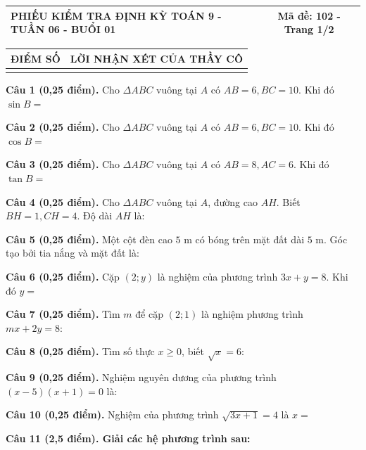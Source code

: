 \documentclass[12pt,a4paper]{article}
\begin{document}
\noindent
\begin{tabularx}{\linewidth}{|X|c|}
\hline
\textbf{PHIẾU KIỂM TRA ĐỊNH KỲ TOÁN 9 - TUẦN 06 - BUỔI 01} & \textbf{Mã đề: 102 - Trang 1/2} \\
\hline
\end{tabularx}

\vspace{1.0mm}

\noindent
\begin{tabularx}{\linewidth}{|p{3.2cm}|X|}
\hline
\centering\textbf{ĐIỂM SỐ} & \centering\textbf{LỜI NHẬN XÉT CỦA THẦY CÔ} \tabularnewline
\hline
\rule{0pt}{1.8cm} & \tabularnewline
\hline
\end{tabularx}

\vspace{1.2mm}
\noindent\textbf{Câu 1 (0,25 điểm).} Cho $\Delta ABC$ vuông tại $A$ có $AB = 6, BC = 10$. Khi đó $\sin B =$ \par\vspace{0.8mm}
\noindent\textbf{Câu 2 (0,25 điểm).} Cho $\Delta ABC$ vuông tại $A$ có $AB = 6, BC = 10$. Khi đó $\cos B =$ \par\vspace{0.8mm}
\noindent\textbf{Câu 3 (0,25 điểm).} Cho $\Delta ABC$ vuông tại $A$ có $AB = 8, AC = 6$. Khi đó $\tan B =$ \par\vspace{0.8mm}
\noindent\textbf{Câu 4 (0,25 điểm).} Cho $\Delta ABC$ vuông tại $A$, đường cao $AH$. Biết $BH=1, CH=4$. Độ dài $AH$ là: \par\vspace{0.8mm}
\noindent\textbf{Câu 5 (0,25 điểm).} Một cột đèn cao $5\text{ m}$ có bóng trên mặt đất dài $5\text{ m}$. Góc tạo bởi tia nắng và mặt đất là: \par\vspace{0.8mm}
\noindent\textbf{Câu 6 (0,25 điểm).} Cặp $(2; y)$ là nghiệm của phương trình $3x + y = 8$. Khi đó $y =$ \par\vspace{0.8mm}
\noindent\textbf{Câu 7 (0,25 điểm).} Tìm $m$ để cặp $(2; 1)$ là nghiệm phương trình $mx + 2y = 8$: \par\vspace{0.8mm}
\noindent\textbf{Câu 8 (0,25 điểm).} Tìm số thực $x \ge 0$, biết $\sqrt{x} = 6$: \par\vspace{0.8mm}
\noindent\textbf{Câu 9 (0,25 điểm).} Nghiệm nguyên dương của phương trình $(x - 5)(x + 1) = 0$ là: \par\vspace{0.8mm}
\noindent\textbf{Câu 10 (0,25 điểm).} Nghiệm của phương trình $\sqrt{3x + 1} = 4$ là $x =$ \par\vspace{0.8mm}
\vspace{0.8mm}
\noindent\textbf{Câu 11 (2,5 điểm). Giải các hệ phương trình sau:}
\vspace{0.6mm}
\end{document}
